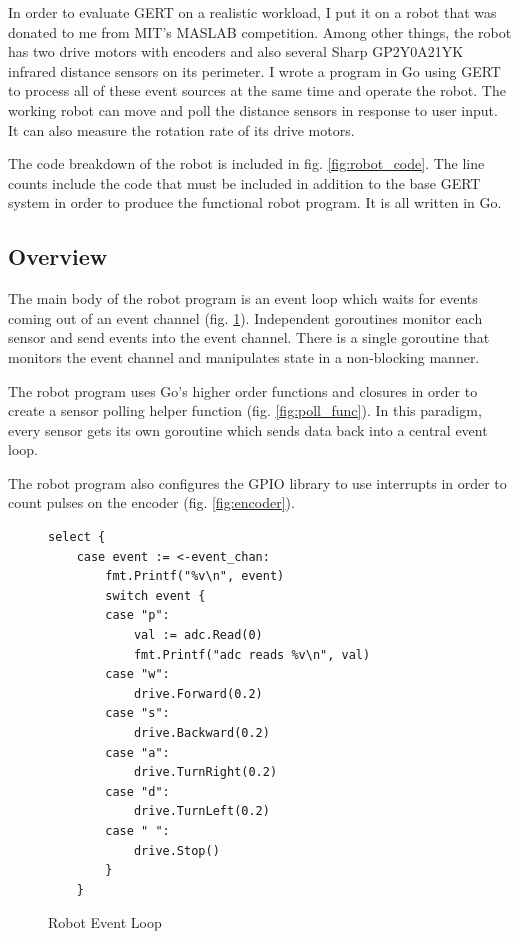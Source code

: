 In order to evaluate GERT on a realistic workload, I put it on a robot that was
donated to me from MIT's MASLAB \cite{maslab} competition. Among other things, the robot has two drive
motors with encoders and also several Sharp GP2Y0A21YK infrared distance sensors on its perimeter.
I wrote a program in Go using GERT to process all of these event sources at the same time
and operate the robot. The working robot can move and poll the distance sensors in response to user input.
It can also measure the rotation rate of its drive motors.

The code breakdown of the robot is included in fig. \ref{fig:robot_code}. The line counts include the code that must be
included in addition to the base GERT system in order to produce the functional robot program. It is all written
in Go.

\subsection{Overview}
The main body of the robot program is an event loop which waits for events coming out of an event channel (fig. \ref{fig:event_loop}).
Independent goroutines monitor each sensor and send events into the event channel. There is a
single goroutine that monitors the event channel and manipulates state in a non-blocking manner.

The robot program uses Go's higher order functions and closures in order to create a sensor polling helper function
(fig. \ref{fig:poll_func}). In this paradigm, every sensor gets its own goroutine which sends
data back into a central event loop.

The robot program also configures the GPIO library to use interrupts in order to count pulses on the encoder (fig. \ref{fig:encoder}).

\begin{figure}[!h]
  \begin{center}
\begin{lstlisting}
select {
	case event := <-event_chan:
		fmt.Printf("%v\n", event)
		switch event {
		case "p":
			val := adc.Read(0)
			fmt.Printf("adc reads %v\n", val)
		case "w":
			drive.Forward(0.2)
		case "s":
			drive.Backward(0.2)
		case "a":
			drive.TurnRight(0.2)
		case "d":
			drive.TurnLeft(0.2)
		case " ":
			drive.Stop()
		}
	}
\end{lstlisting}
\end{center}
  \caption{Robot Event Loop} \label{fig:event_loop}
\end{figure}


